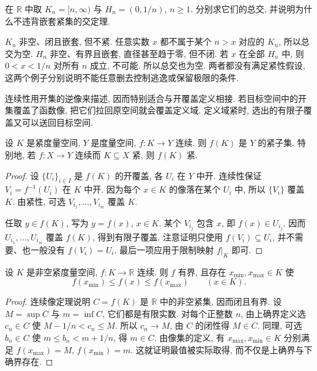 \begin{example}
在 $\mathbb{R}$ 中取 $K_n=[n,\infty)$ 与 $H_n=(0,1/n)$, $n\geq1$. 分别求它们的总交, 并说明为什么不违背嵌套紧集的交定理.
\end{example}
\begin{solution}
$K_n$ 非空、闭且嵌套, 但不紧. 任意实数 $x$ 都不属于某个 $n>x$ 对应的 $K_n$, 所以总交为空. $H_n$ 非空、有界且嵌套, 直径甚至趋于零, 但不闭. 若 $x$ 在全部 $H_n$ 中, 则 $0<x<1/n$ 对所有 $n$ 成立, 不可能. 所以总交也为空. 两者都没有满足紧性假设, 这两个例子分别说明不能任意删去控制逃逸或保留极限的条件.
\end{solution}

\label{ch:compact:continuous-images}

连续性用开集的逆像来描述, 因而特别适合与开覆盖定义相接. 若目标空间中的开集覆盖了函数像, 把它们拉回原空间就会覆盖定义域. 定义域紧时, 选出的有限子覆盖又可以送回目标空间.

\begin{theorem}[紧集的连续像]
\label{ch:compact:image}
设 $K$ 是紧度量空间, $Y$ 是度量空间, $f:K\to Y$ 连续. 则 $f(K)$ 是 $Y$ 的紧子集. 特别地, 若 $f:X\to Y$ 连续而 $K\subseteq X$ 紧, 则 $f(K)$ 紧.
\end{theorem}
\begin{proof}
设 $\{U_i\}_{i\in I}$ 是 $f(K)$ 的开覆盖, 各 $U_i$ 在 $Y$ 中开. 连续性保证 $V_i=f^{-1}(U_i)$ 在 $K$ 中开. 因为每个 $x\in K$ 的像落在某个 $U_i$ 中, 所以 $\{V_i\}$ 覆盖 $K$. 由紧性, 可选 $V_{i_1},\ldots,V_{i_m}$ 覆盖 $K$.

任取 $y\in f(K)$, 写为 $y=f(x)$, $x\in K$. 某个 $V_{i_j}$ 包含 $x$, 即 $f(x)\in U_{i_j}$. 因而 $U_{i_1},\ldots,U_{i_m}$ 覆盖 $f(K)$, 得到有限子覆盖. 注意证明只使用 $f(V_i)\subseteq U_i$, 并不需要、也一般没有 $f(V_i)=U_i$. 最后一项应用于限制映射 $f|_K$ 即可.
\end{proof}

\begin{theorem}[紧集上的极值定理]
\label{ch:compact:extreme-values}
设 $K$ 是非空紧度量空间, $f:K\to\mathbb{R}$ 连续. 则 $f$ 有界, 且存在 $x_{\min},x_{\max}\in K$ 使
\[
 f(x_{\min})\leq f(x)\leq f(x_{\max})
 \qquad(x\in K).
\]
\end{theorem}
\begin{proof}
连续像定理说明 $C=f(K)$ 是 $\mathbb{R}$ 中的非空紧集, 因而闭且有界. 设 $M=\sup C$ 与 $m=\inf C$, 它们都是有限实数. 对每个正整数 $n$, 由上确界定义选 $c_n\in C$ 使 $M-1/n<c_n\leq M$. 所以 $c_n\to M$, 由 $C$ 的闭性得 $M\in C$. 同理, 可选 $b_n\in C$ 使 $m\leq b_n<m+1/n$, 得 $m\in C$. 由像集的定义, 有 $x_{\max},x_{\min}\in K$ 分别满足 $f(x_{\max})=M$, $f(x_{\min})=m$. 这就证明最值被实际取得, 而不仅是上确界与下确界存在.
\end{proof}

